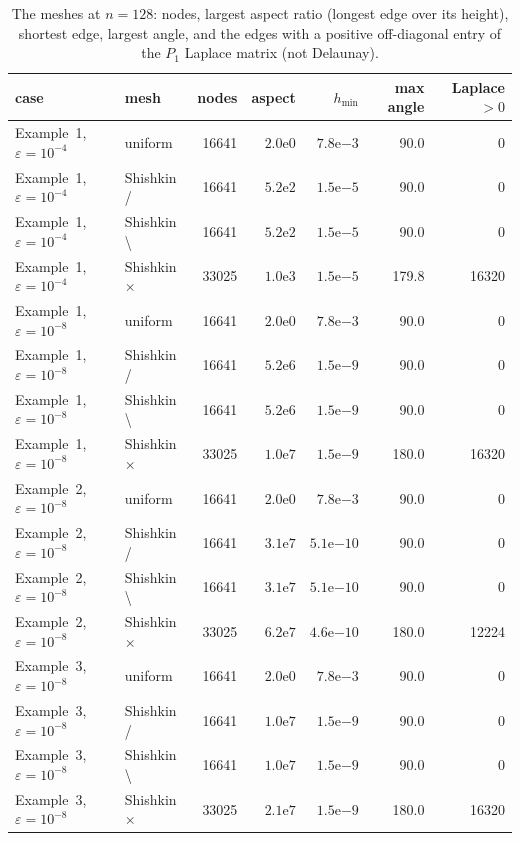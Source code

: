 \begin{table}[!htbp]
\centering\scriptsize\setlength{\tabcolsep}{3pt}
\caption{The meshes at $n=128$: nodes, largest aspect ratio (longest edge over its height), shortest edge, largest angle, and the edges with a positive off-diagonal entry of the $P_1$ Laplace matrix (not Delaunay).}\label{tab:mesh}
\begin{tabular}{llrrrrr}
\toprule
case & mesh & nodes & aspect & $h_{\min}$ & max angle & Laplace $>0$\\
\midrule
Example~1, $\varepsilon=10^{-4}$ & uniform & 16641 & $2.0\mathrm{e}{0}$ & $7.8\mathrm{e}{-3}$ & 90.0 & 0 \\
Example~1, $\varepsilon=10^{-4}$ & Shishkin / & 16641 & $5.2\mathrm{e}{2}$ & $1.5\mathrm{e}{-5}$ & 90.0 & 0 \\
Example~1, $\varepsilon=10^{-4}$ & Shishkin \textbackslash & 16641 & $5.2\mathrm{e}{2}$ & $1.5\mathrm{e}{-5}$ & 90.0 & 0 \\
Example~1, $\varepsilon=10^{-4}$ & Shishkin $\times$ & 33025 & $1.0\mathrm{e}{3}$ & $1.5\mathrm{e}{-5}$ & 179.8 & 16320 \\
Example~1, $\varepsilon=10^{-8}$ & uniform & 16641 & $2.0\mathrm{e}{0}$ & $7.8\mathrm{e}{-3}$ & 90.0 & 0 \\
Example~1, $\varepsilon=10^{-8}$ & Shishkin / & 16641 & $5.2\mathrm{e}{6}$ & $1.5\mathrm{e}{-9}$ & 90.0 & 0 \\
Example~1, $\varepsilon=10^{-8}$ & Shishkin \textbackslash & 16641 & $5.2\mathrm{e}{6}$ & $1.5\mathrm{e}{-9}$ & 90.0 & 0 \\
Example~1, $\varepsilon=10^{-8}$ & Shishkin $\times$ & 33025 & $1.0\mathrm{e}{7}$ & $1.5\mathrm{e}{-9}$ & 180.0 & 16320 \\
Example~2, $\varepsilon=10^{-8}$ & uniform & 16641 & $2.0\mathrm{e}{0}$ & $7.8\mathrm{e}{-3}$ & 90.0 & 0 \\
Example~2, $\varepsilon=10^{-8}$ & Shishkin / & 16641 & $3.1\mathrm{e}{7}$ & $5.1\mathrm{e}{-10}$ & 90.0 & 0 \\
Example~2, $\varepsilon=10^{-8}$ & Shishkin \textbackslash & 16641 & $3.1\mathrm{e}{7}$ & $5.1\mathrm{e}{-10}$ & 90.0 & 0 \\
Example~2, $\varepsilon=10^{-8}$ & Shishkin $\times$ & 33025 & $6.2\mathrm{e}{7}$ & $4.6\mathrm{e}{-10}$ & 180.0 & 12224 \\
Example~3, $\varepsilon=10^{-8}$ & uniform & 16641 & $2.0\mathrm{e}{0}$ & $7.8\mathrm{e}{-3}$ & 90.0 & 0 \\
Example~3, $\varepsilon=10^{-8}$ & Shishkin / & 16641 & $1.0\mathrm{e}{7}$ & $1.5\mathrm{e}{-9}$ & 90.0 & 0 \\
Example~3, $\varepsilon=10^{-8}$ & Shishkin \textbackslash & 16641 & $1.0\mathrm{e}{7}$ & $1.5\mathrm{e}{-9}$ & 90.0 & 0 \\
Example~3, $\varepsilon=10^{-8}$ & Shishkin $\times$ & 33025 & $2.1\mathrm{e}{7}$ & $1.5\mathrm{e}{-9}$ & 180.0 & 16320 \\
\bottomrule
\end{tabular}
\end{table}
